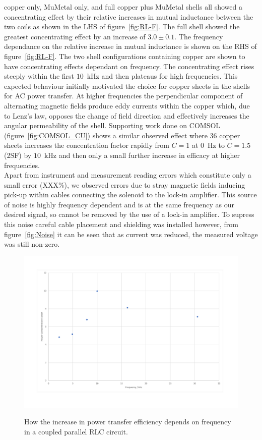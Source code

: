 \documentclass[11pt]{iopart}
\begin{document}
copper only, MuMetal only, and full copper plus MuMetal shells all
showed a concentrating effect by their relative increases in mutual
inductance between the two coils as shown in the LHS of
figure~\ref{fig:RL-F}. The full shell showed the greatest
concentrating effect by an increase of $3.0\pm0.1$. The frequency
dependance on the relative increase in mutual inductance is shown on
the RHS of figure~\ref{fig:RL-F}. The two shell configurations
containing copper are shown to have concentrating effects dependant on
frequency. The concentrating effect rises steeply within the first
$10$~kHz and then plateaus for high frequencies.
This expected behaviour initially motivated the choice for copper sheets in the
shells for AC power transfer. At higher frequencies the perpendicular
component of alternating magnetic fields produce eddy currents within
the copper which, due to Lenz's law, opposes the change of field
direction and effectively increases the angular permeability of the
shell.  Supporting work done on COMSOL (figure~\ref{fig:COMSOL_CU})
shows a similar observed effect where 36 copper sheets increases the
concentration factor rapidly from $C = 1$ at $0$~Hz to $C = 1.5$ (2SF)
by $10$~kHz and then only a small further increase in efficacy at higher
frequencies.\\


Apart from instrument and measurement reading errors which
constitute only a small error (XXX\%), we observed errors due to stray
magnetic fields inducing pick-up within cables connecting the solenoid
to the lock-in amplifier. This source of noise is highly frequency
dependent and is at the same frequency as our desired signal, so
cannot be removed by the use of a lock-in amplifier. To supress this
noise careful cable placement and shielding was installed however,
from figure~\ref{fig:Noise} it can be seen that as current was
reduced, the measured voltage was still non-zero.\\

\begin{figure}
  \begin{center}
   \noindent\includegraphics[width=0.75\linewidth]{images/RLC-P.pdf}
  \label{fig:RLC-P}
  \end{center}
  \caption{How the increase in power transfer efficiency depends on
    frequency in a coupled parallel RLC circuit.}
\end{figure}
\end{document}
